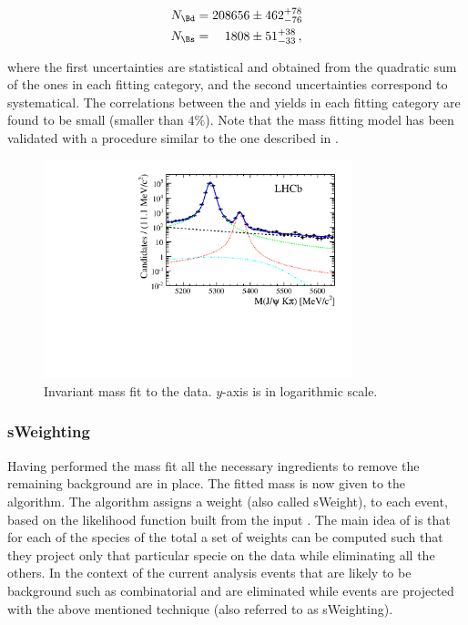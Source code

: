 \begin{align}
N_{\Bd} &= 208656  \pm  462 ^{+ 78	}_{- 76}\\
N_{\Bs} &= \phantom{00}1808  \pm   51 ^{+ 38	}_{- 33} \, ,
\label{signal_yields}
\end{align}

\noindent where the first uncertainties are statistical and obtained from the quadratic sum of the ones in each fitting category, 
and the second uncertainties correspond to systematical. The correlations between the \Bd and \Bs yields in each fitting category
are found to be small (smaller than $4\%$). Note that the mass fitting model has been validated with a procedure similar to the
one described in . 

\begin{figure}[h]
\begin{center}
  \includegraphics[width=0.8\textwidth]{Figures/Chapter4/mass_plot_simul_log.pdf}
  \caption{Invariant mass fit to the data. $y$-axis is in logarithmic scale.}
  \label{mass_plot}
\end{center}
\end{figure}

\subsubsection{sWeighting}
Having performed the mass fit all the necessary ingredients to remove the remaining background are in place. 
The fitted mass \pdf is now given to the \sPlot algorithm. The algorithm assigns a weight (also called sWeight), to each event,
based on the likelihood function built from the input \pdf. The main idea of \sPlot is that for each of the species of the total
\pdf a set of weights can be computed such that they project only that particular specie on the data while eliminating all the others.  
In the context of the current analysis events that are likely to be background such as combinatorial and \LbJpsipK are
eliminated while \BJpsiKst events are projected with the above mentioned technique (also referred to as sWeighting).

